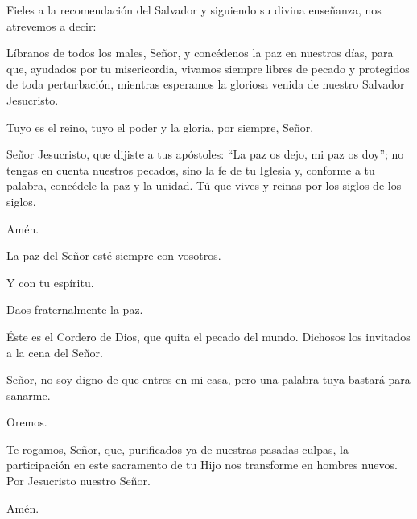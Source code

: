 \pr Fieles a la recomendación del Salvador y siguiendo su divina enseñanza, nos atrevemos a decir:



\pr Líbranos de todos los males, Señor, y concédenos la paz en nuestros días, para que, ayudados por tu misericordia, vivamos siempre libres de pecado y protegidos de toda perturbación, mientras esperamos la gloriosa venida de nuestro Salvador Jesucristo.

\be Tuyo es el reino, tuyo el poder y la gloria, por siempre, Señor.

\pr Señor Jesucristo, que dijiste a tus apóstoles: “La paz os dejo, mi paz os doy”; no tengas en cuenta nuestros pecados, sino la fe de tu Iglesia y, conforme a tu palabra, concédele la paz y la unidad. Tú que vives y reinas por los siglos de los siglos.

\be Amén.

\pr La paz del Señor esté siempre con vosotros.

\be Y con tu espíritu.

\pr Daos fraternalmente la paz.



\pr Éste es el Cordero de Dios, que quita el pecado del mundo. Dichosos los invitados a la cena del Señor.

\be Señor, no soy digno de que entres en mi casa, pero una palabra tuya bastará para sanarme.

\pr Oremos.

\pr Te rogamos, Señor, que, purificados ya de nuestras pasadas culpas, la participación en este sacramento de tu Hijo nos transforme en hombres nuevos. Por Jesucristo nuestro Señor.

\be Amén.